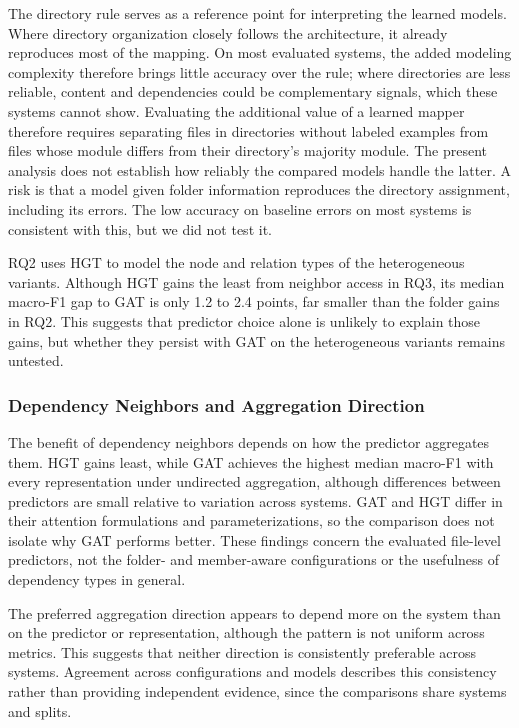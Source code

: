 The directory rule serves as a reference point for interpreting the learned models. Where directory organization closely follows the architecture, it already reproduces most of the mapping. On most evaluated systems, the added modeling complexity therefore brings little accuracy over the rule; where directories are less reliable, content and dependencies could be complementary signals, which these systems cannot show. Evaluating the additional value of a learned mapper therefore requires separating files in directories without labeled examples from files whose module differs from their directory's majority module. The present analysis does not establish how reliably the compared models handle the latter. A risk is that a model given folder information reproduces the directory assignment, including its errors. The low accuracy on baseline errors on most systems is consistent with this, but we did not test it.
 
RQ2 uses HGT to model the node and relation types of the heterogeneous variants. Although HGT gains the least from neighbor access in RQ3, its median macro-F1 gap to GAT is only 1.2 to 2.4 points, far smaller than the folder gains in RQ2. This suggests that predictor choice alone is unlikely to explain those gains, but whether they persist with GAT on the heterogeneous variants remains untested.

\subsubsection*{Dependency Neighbors and Aggregation Direction}
The benefit of dependency neighbors depends on how the predictor aggregates them. HGT gains least, while GAT achieves the highest median macro-F1 with every representation under undirected aggregation, although differences between predictors are small relative to variation across systems. GAT and HGT differ in their attention formulations and parameterizations, so the comparison does not isolate why GAT performs better. These findings concern the evaluated file-level predictors, not the folder- and member-aware configurations or the usefulness of dependency types in general.

The preferred aggregation direction appears to depend more on the system than on the predictor or representation, although the pattern is not uniform across metrics. This suggests that neither direction is consistently preferable across systems. Agreement across configurations and models describes this consistency rather than providing independent evidence, since the comparisons share systems and splits.


